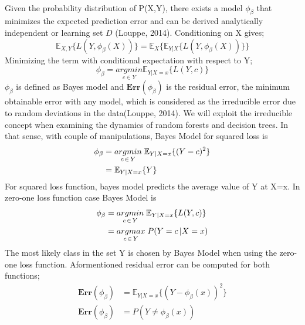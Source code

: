 \paragraph{}
Given the probability distribution of P(X,Y), there exists a model $\phi_{\beta}$ that minimizes the expected prediction error and can be derived analytically independent or learning set $D$ (Louppe, 2014). Conditioning on X gives;
\begin{equation}
\mathbb{E}_{X,Y} \{L(Y, \phi_{\beta}(X))\} = \mathbb{E}_{X}\{\mathbb{E}_{Y|X}\{L(Y, \phi_{\beta}(X)) \} \}
\end{equation}
Minimizing the term with conditional expectation with respect to Y;
\begin{equation}
\phi_{\beta} = \underset{c \in Y}{argmin} \mathbb{E}_{Y|X=x}\{L(Y,c)\}
\end{equation}
$\phi_{\beta}$ is defined as Bayes model and $\boldsymbol{Err}(\phi_{\beta})$ is the residual error, the minimum obtainable error with any model, which is considered as the irreducible error due to random deviations in the data(Louppe, 2014). We will exploit the irreducible concept when examining the dynamics of random forests and decision trees. In that sense, with couple of manipulations, Bayes Model for squared loss is
\begin{align}
\phi_{\beta} & = \underset{c \,\in\, Y}{argmin} \; \mathbb{E}_{Y|X=x}\{(Y-c)^2 \} \notag\\
			 & = \mathbb{E}_{Y|X=x}\{Y\}
\end{align}
For squared loss function, bayes model predicts the average value of Y at X=x. In zero-one loss function case Bayes Model is
\begin{align}
\phi_{\beta} & = \underset{c \,\in\, Y}{argmin} \; \mathbb{E}_{Y|X=x}\{L(Y,c) \} \notag\\
			 & = \underset{c \,\in\, Y}{argmax} \; P(Y = c \,| X = x)
\end{align}
The most likely class in the set Y is chosen by Bayes Model when using the zero-one loss function. Aformentioned residual error can be computed for both functions;
\begin{align}
\boldsymbol{Err}(\phi_{\beta}) & = \mathbb{E}_{Y|X=x}\{(Y-\phi_{\beta}(x))^2 \}\\
\boldsymbol{Err}(\phi_{\beta}) & = P(Y \neq \phi_{\beta}(x) )
\end{align}

